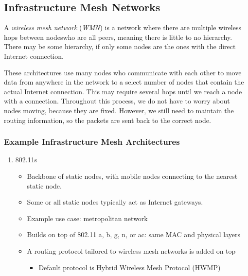 \subsection{Infrastructure Mesh Networks}\label{subsec:Infrastructure_Mesh_Networks}
\begin{definition}\label{def:Wireless_Mesh_Network}
  A \emph{wireless mesh network} (\emph{WMN}) is a network where there are multiple wireless hops between nodeswho are all peers, meaning there is little to no hierarchy.
  There may be some hierarchy, if only some nodes are the ones with the direct Internet connection.
\end{definition}

These architectures use many nodes who communicate with each other to move data from anywhere in the network to a select number of nodes that contain the actual Internet connection.
This may require several hops until we reach a node with a connection.
Throughout this process, we do not have to worry about nodes moving, because they are fixed.
However, we still need to maintain the routing information, so the packets are sent back to the correct node.

\subsubsection{Example Infrastructure Mesh Architectures}\label{subsubsec:Example_Mesh_Architectures}
\begin{enumerate}[noitemsep]
\item 802.11s
  \begin{itemize}[noitemsep]
  \item Backbone of static nodes, with mobile nodes connecting to the nearest static node.
  \item Some or all static nodes typically act as Internet gateways.
  \item Example use case: metropolitan network
  \item Builds on top of 802.11 a, b, g, n, or ac: same MAC and physical layers
  \item A routing protocol tailored to wireless mesh networks is added on top
    \begin{itemize}[noitemsep]
    \item Default protocol is Hybrid Wireless Mesh Protocol (HWMP)
    \end{itemize}
  \end{itemize}
\end{enumerate}

